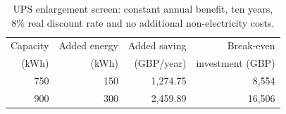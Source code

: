 \begin{table}[htbp]
\centering\small
\caption{UPS enlargement screen: constant annual benefit, ten years, 8\% real discount rate and no additional non-electricity costs.}\label{tab:ups-screen}
\begin{tabular}{@{}rrrr@{}}\toprule
Capacity & Added energy & Added saving & Break-even\\(kWh) & (kWh) & (GBP/year) & investment (GBP) \\\midrule
750 & 150 & 1,274.75 & 8,554 \\
900 & 300 & 2,459.89 & 16,506 \\
\bottomrule\end{tabular}
\end{table}
